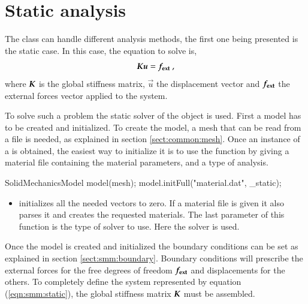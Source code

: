 \section{Static analysis\label{sect:smm:static}}

The  class can  handle different analysis methods, the
first one being presented is the static case.  In this case, the equation
to solve is,
\begin{equation}\label{eqn:smm:static}
  \boldsymbol{K} \boldsymbol{u} = \boldsymbol{f_{{\mathrm{ext}}}}~,
\end{equation}
where  $\boldsymbol{K}$ is  the  global stiffness  matrix,  $\vec{u}$ the  displacement
vector  and  $\boldsymbol{f_{{\mathrm{ext}}}}$ the  external  forces  vector  applied to  the
system.


To     solve    such     a    problem     the    static     solver     of    the
  object is used.   First a
model has to be  created and initialized.  To create the model,  a mesh that can
be read from  a file is needed, as  explained in section \ref{sect:common:mesh}.
Once an instance of a  is obtained, the easiest way to
initialize it is  to use the 
function by  giving a  material file containing  the material parameters,  and a
type of analysis.

\begin{cpp}
  SolidMechanicsModel model(mesh);
  model.initFull("material.dat", _static);
\end{cpp}


\begin{itemize}
\item {}  initializes all the  needed vectors to zero.   If a
  material file is given it also  parses it and creates the requested materials.
  The last  parameter of this function  is the type  of solver to use.  Here the
   solver is used.
\end{itemize}


Once the model is created and  initialized the boundary conditions can be set as
explained   in  section   \ref{sect:smm:boundary}.   Boundary   conditions  will
prescribe   the   external   forces    for   the   free   degrees   of   freedom
$\boldsymbol{f_{{\mathrm{ext}}}}$ and displacements for the others.  To completely define the
system  represented  by equation  (\ref{eqn:smm:static}),  the global  stiffness
matrix            $\boldsymbol{K}$             must            be            assembled.

